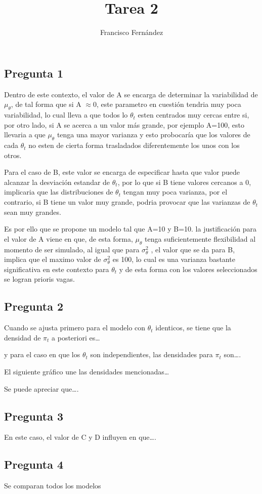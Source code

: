 \documentclass[
  letterpaper,
  DIV=11,
  numbers=noendperiod]{scrartcl}
\title{\\
Tarea 2\\}
\author{Francisco Fernández}
\date{}
\renewcommand*\contentsname{Table of contents}
\newcommand\contentsname{Table of contents}
\begin{document}
\maketitle

\renewcommand*\contentsname{Ítems}
{
\hypersetup{linkcolor=}
\setcounter{tocdepth}{3}
\tableofcontents
}
\subsection{Pregunta 1}\label{pregunta-1}

Dentro de este contexto, el valor de A se encarga de determinar la
variabilidad de \(\mu_\theta\), de tal forma que si A \(\approx 0\),
este parametro en cuestión tendria muy poca variabilidad, lo cual lleva
a que todos lo \(\theta_t\) esten centrados muy cercas entre si, por
otro lado, si A se acerca a un valor más grande, por ejemplo A=100, esto
llevaria a que \(\mu_\theta\) tenga una mayor varianza y esto probocaría
que los valores de cada \(\theta_t\) no esten de cierta forma
trasladados diferentemente los unos con los otros.

Para el caso de B, este valor se encarga de especificar hasta que valor
puede alcanzar la desviación estandar de \(\theta_t\), por lo que si B
tiene valores cercanos a 0, implicaria que las distribuciones de
\(\theta_t\) tengan muy poca varianza, por el contrario, si B tiene un
valor muy grande, podria provocar que las varianzas de \(\theta_t\) sean
muy grandes.

Es por ello que se propone un modelo tal que A=10 y B=10. la
justificación para el valor de A viene en que, de esta forma,
\(\mu_\theta\) tenga suficientemente flexibilidad al momento de ser
simulado, al igual que para \(\sigma^2_\theta\) , el valor que se da
para B, implica que el maximo valor de \(\sigma^2_\theta\) es 100, lo
cual es una varianza bastante significativa en este contexto para
\(\theta_t\) y de esta forma con los valores seleccionados se logran
prioris vagas.

\subsection{Pregunta 2}\label{pregunta-2}

Cuando se ajusta primero para el modelo con \(\theta_t\) identicos, se
tiene que la densidad de \(\pi_t\) a posteriori es\ldots{}

y para el caso en que los \(\theta_t\) son independientes, las
densidades para \(\pi_t\) son\ldots.

El siguiente gráfico une las densidades mencionadas\ldots{}

Se puede apreciar que\ldots.

\subsection{Pregunta 3}\label{pregunta-3}

En este caso, el valor de C y D influyen en que\ldots.

\subsection{Pregunta 4}\label{pregunta-4}

Se comparan todos los modelos
\end{document}
